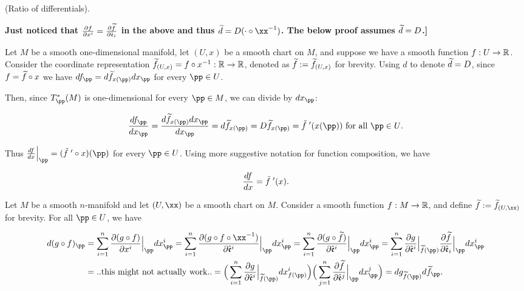 \begin{theorem}
    (Ratio of differentials).

    \textbf{Just noticed that $\frac{\partial f}{\partial x^i} = \frac{\partial \widetilde{f}}{\partial \hat{\mathfrak{e}}_i}$ in the above and thus $\td = D(\cdot \circ \xx^{-1})$. The below proof assumes $\widetilde{d} = D$.]}

    Let $M$ be a smooth one-dimensional manifold, let $(U, x)$ be a smooth chart on $M$, and suppose we have a smooth function $f:U \rightarrow \mathbb{R}$. Consider the coordinate representation $\widetilde{f}_{(U, x)} = f \circ x^{-1}:\mathbb{R} \rightarrow \mathbb{R}$, denoted as $\widetilde{f} := \widetilde{f}_{(U, x)}$ for brevity. Using $d$ to denote $\widetilde{d} = D$, since $f = \widetilde{f} \circ x$ we have $df_\pp = d\tf_{x(\pp)} dx_\pp$ for every $\pp \in U$. 
    
    Then, since $T_\pp^*(M)$ is one-dimensional for every $\pp \in M$, we can divide by $dx_\pp$:
    
    \begin{align*}
        \frac{df_\pp}{dx_\pp} = \frac{d\tf_{x(\pp)} dx_\pp}{dx_\pp} = d\tf_{x(\pp)} = D\tf_{x(\pp)} = \tfPrime(x(\pp)) \text{ for all $\pp \in U$}.
    \end{align*}
    
    Thus $\frac{df}{dx}\Big|_\pp = (\tfPrime \circ x)(\pp)$ for every $\pp \in U$. Using more suggestive notation for function composition, we have
    
    \begin{align*}
        \frac{df}{dx} = \tfPrime(x).
    \end{align*}
\end{theorem}

\begin{lemma}
    [TO-DO. Supposedly it's possible to obtain the same result when $M$ is a manifold of arbitrary dimension. The claim is that the chain rule $d(g \circ f)_\pp = dg_{f(\pp)} df_\pp$ holds when $f:M \rightarrow \R$ and $g:\R \rightarrow \R$]

    Let $M$ be a smooth $n$-manifold and let $(U, \xx)$ be a smooth chart on $M$. Consider a smooth function $f:M \rightarrow \R$, and define $\tf := \tf_{(U, \xx)}$ for brevity. For all $\pp \in U$, we have
    
    \begin{align*}
        d(g \circ f)_\pp &= \sum_{i = 1}^n \frac{\pd(g \circ f)}{\pd x^i}\Big|_\pp dx^i_\pp = \sum_{i = 1}^n \frac{\pd(g \circ f \circ \xx^{-1})}{\pd \see^i}\Big|_\pp dx^i_\pp = \sum_{i = 1}^n \frac{\pd(g \circ \tf)}{\pd \see^i}\Big|_\pp dx^i_\pp = \sum_{i = 1}^n \frac{\pd g}{\pd \see^i}\Big|_{\tf(\pp)} \frac{\pd \tf}{\pd \see_i}\Big|_\pp dx^i_\pp \\
        &= ..\text{this might not actually work}.. = \Big(\sum_{i = 1}^n \frac{\pd g}{\pd \see^i}\Big|_{\tf(\pp)} dx^i_{f(\pp)} \Big) \Big(\sum_{j = 1}^n \frac{\pd \tf}{\pd \see^j}\Big|_\pp dx^j_\pp \Big) = dg_{\tf(\pp)} d\tf_\pp. 
    \end{align*}

    
\end{lemma}


